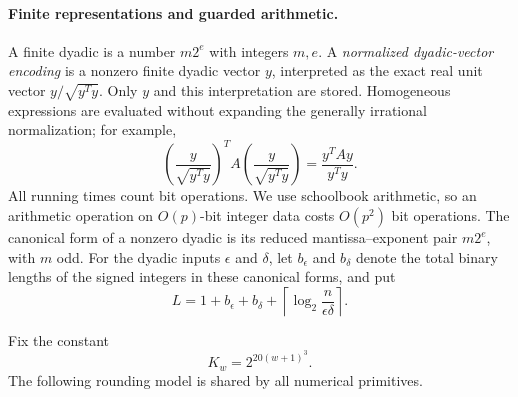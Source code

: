 \documentclass[11pt]{article}
\begin{document}
\paragraph{Finite representations and guarded arithmetic.}
A finite dyadic is a number $m2^e$ with integers $m,e$.  A
\emph{normalized dyadic-vector encoding} is a nonzero finite dyadic vector
$y$, interpreted as the exact real unit vector $y/\sqrt{y^Ty}$.  Only $y$
and this interpretation are stored.  Homogeneous expressions are evaluated
without expanding the generally irrational normalization; for example,
\[
 \left(\frac{y}{\sqrt{y^Ty}}\right)^TA
 \left(\frac{y}{\sqrt{y^Ty}}\right)=\frac{y^TAy}{y^Ty}.
\]
All running times count bit operations.  We use schoolbook arithmetic, so an
arithmetic operation on $O(p)$-bit integer data costs $O(p^2)$ bit
operations.  The canonical form of a nonzero dyadic is its reduced
mantissa--exponent pair $m2^e$, with $m$ odd.  For the dyadic inputs
$\epsilon$ and $\delta$, let $b_\epsilon$ and $b_\delta$ denote the total
binary lengths of the signed integers in these canonical forms, and put
\[
 L=1+b_\epsilon+b_\delta+
 \left\lceil\log_2\frac{n}{\epsilon\delta}\right\rceil.
\]

Fix the constant
\[
 K_w=2^{20(w+1)^3}.
\]
The following rounding model is shared by all numerical primitives.
\end{document}
